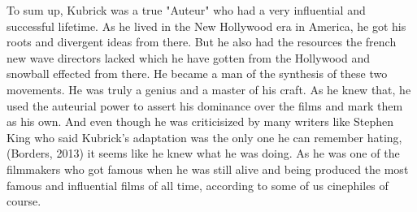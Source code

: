 \documentclass[12pt]{article}
\begin{document}
\par
To sum up, Kubrick was a true "Auteur" who had a very influential and successful lifetime. As he lived in the New Hollywood era in America,
he got his roots and divergent ideas from there. But he also had the resources the french new wave directors lacked which he have gotten from the Hollywood and snowball effected from there.
He became a man of the synthesis of these two movements. He was truly a genius and a master of his craft. As he knew that, he used the auteurial power to assert his dominance over the films
and mark them as his own. And even though he was criticisized by many writers like Stephen King who said Kubrick's adaptation was the only one he can remember hating,
(Borders, 2013) it seems like he knew what he was doing. As he was one of the filmmakers who got famous when he was still alive and
being produced the most famous and influential films of all time, according to some of us cinephiles of course.
\\

\end{document}
